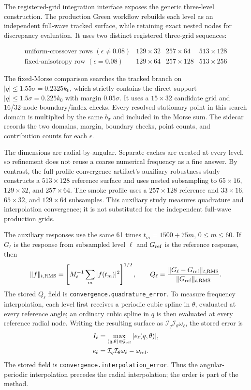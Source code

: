 The registered-grid integration interface exposes the generic three-level
construction.  The production Green workflow rebuilds
each level as an independent full-wave tracked surface, while retaining exact
nested nodes for discrepancy evaluation.  It uses two distinct registered
three-grid sequences:

\[
 \begin{array}{c|ccc}
 \text{uniform-crossover rows }(\epsilon\ne0.08)
   &129\times32&257\times64&513\times128\\
 \text{fixed-anisotropy row }(\epsilon=0.08)
   &129\times64&257\times128&513\times256
 \end{array}
\]

The fixed-Morse comparison searches the tracked branch on
\(|q|\leq1.55\sigma=0.2325k_0\), which strictly contains the direct support
\(|q|\leq1.5\sigma=0.225k_0\) with margin \(0.05\sigma\).  It uses a
\(15\times32\) candidate grid and 16/32-node boundary/index checks.  Every
resolved stationary point in this search domain is multiplied by the same
\(b_\sigma\) and included in the Morse sum.  The sidecar records the two
domains, margin, boundary checks, point counts, and contribution counts for
each \(\epsilon\).

The dimensions are radial-by-angular.  Separate caches are created at every
level, so refinement does not reuse a coarse numerical frequency as a fine
answer.  By contrast, the full-profile convergence artifact's auxiliary
robustness study constructs a \(513\times128\) reference surface and uses
nested subsampling to \(65\times16\), \(129\times32\), and
\(257\times64\).  The smoke profile uses a \(257\times128\) reference and
\(33\times16\), \(65\times32\), and \(129\times64\) subsamples.  This
auxiliary study measures quadrature and interpolation convergence; it is not
substituted for the independent full-wave production grids.

The auxiliary responses use the same 61 times
\(t_m=1500+75m\), \(0\leq m\leq60\).  If \(G_\ell\) is the response from
subsampled level \(\ell\) and \(G_{\rm ref}\) is the reference response, then
\[
 \|f\|_{t,{\rm RMS}}=
 \left[M_t^{-1}\sum_m|f(t_m)|^2\right]^{1/2},
 \qquad
 Q_\ell=\frac{\|G_\ell-G_{\rm ref}\|_{t,{\rm RMS}}}
 {\|G_{\rm ref}\|_{t,{\rm RMS}}}.
\]
The stored \(Q_\ell\) field is
\texttt{convergence.quadrature\_error}.
To measure frequency interpolation, each level first receives a periodic
cubic spline in \(\theta\), evaluated at every reference angle; an ordinary
cubic spline in \(q\) is then evaluated at every reference radial node.
Writing the resulting surface as
\(\mathcal I_q\mathcal I_\theta\omega_\ell\), the stored error is
\[
 \begin{aligned}
 I_\ell&=\max_{(q,\theta)\in\mathcal G_{\rm ref}}
 |e_\ell(q,\theta)|,\\
 e_\ell&=\mathcal I_q\mathcal I_\theta\omega_\ell-\omega_{\rm ref}.
 \end{aligned}
\]
The stored field is \texttt{convergence.interpolation\_error}.
Thus the angular-periodic interpolation precedes the radial interpolation;
the order is part of the method.

